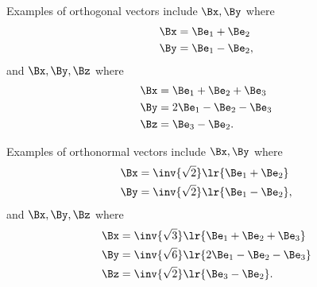 %
%

Examples of orthogonal vectors
include \( \Bx, \By \) where
\begin{equation}\label{eqn:prereq_standardbasis:300}
\begin{aligned}
\Bx &= \Be_1 + \Be_2 \\
\By &= \Be_1 - \Be_2,
\end{aligned}
\end{equation}
and \( \Bx, \By, \Bz \) where
\begin{dmath}\label{eqn:prereq_standardbasis:320}
\begin{aligned}
\Bx &= \Be_1 + \Be_2 + \Be_3 \\
\By &= 2 \Be_1 - \Be_2 - \Be_3 \\
\Bz &= \Be_3 - \Be_2.
\end{aligned}
\end{dmath}


Examples of orthonormal vectors
include \( \Bx, \By \) where
\begin{dmath}\label{eqn:prereq_standardbasis:340}
\begin{aligned}
\Bx &= \inv{\sqrt{2}}\lr{\Be_1 + \Be_2} \\
\By &= \inv{\sqrt{2}}\lr{\Be_1 - \Be_2},
\end{aligned}
\end{dmath}
and \( \Bx, \By, \Bz \) where
\begin{dmath}\label{eqn:prereq_standardbasis:360}
\begin{aligned}
\Bx &= \inv{\sqrt{3}}\lr{\Be_1 + \Be_2 + \Be_3} \\
\By &= \inv{\sqrt{6}}\lr{2 \Be_1 - \Be_2 - \Be_3} \\
\Bz &= \inv{\sqrt{2}}\lr{\Be_3 - \Be_2}.
\end{aligned}
\end{dmath}

